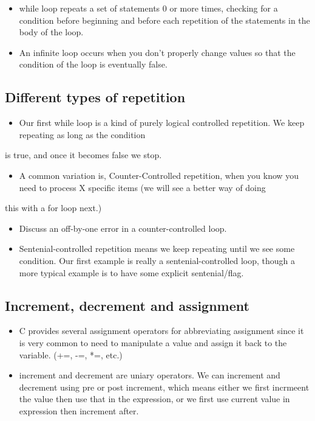 \documentclass[11pt]{article}
\begin{document}
\begin{itemize}
\item while loop repeats a set of statements 0 or more times, checking for
  a condition before beginning and before each repetition of the
  statements in the body of the loop.
\item An infinite loop occurs when you don't properly change values so
  that the condition of the loop is eventually false.
\end{itemize}
\subsection*{Different types of repetition}
\label{sec-2-5}

\begin{itemize}
\item Our first while loop is a kind of purely logical controlled repetition.  We keep repeating as long as the condition
\end{itemize}
is true, and once it becomes false we stop.
\begin{itemize}
\item A common variation is, Counter-Controlled repetition, when you know you need to process X specific items (we will see a better way of doing
\end{itemize}
this with a for loop next.)
\begin{itemize}
\item Discuss an off-by-one error in a counter-controlled loop.
\item Sentenial-controlled repetition means we keep repeating until we see
  some condition.  Our first example is really a sentenial-controlled
  loop, though a more typical example is to have some explicit
  sentenial/flag.
\end{itemize}
\subsection*{Increment, decrement and assignment}
\label{sec-2-6}

\begin{itemize}
\item C provides several assignment operators for abbreviating
  assignment since it is very common to need to manipulate a value and
  assign it back to the variable. (+=, -=, *=, etc.)
\item increment and decrement are uniary operators.  We can increment and
  decrement using pre or post increment, which means either we first
  incrmeent the value then use that in the expression, or we first use
  current value in expression then increment after.
\end{itemize}
\end{document}
